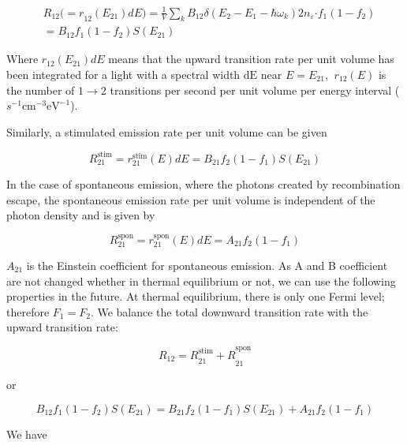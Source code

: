 \begin{eqnarray}
   & R_{12}{( = r}_{12}(E_{21})dE) = \frac{1}{V}\sum_{k}^{}{B_{12}\delta\left( E_{2} - E_{1} - \hbar\omega_{k} \right)}2n_{\varepsilon}\mathbf{\cdot}f_{1}(1 - f_{2})\nonumber \\
   & = B_{12}f_{1}(1 - f_{2})S\left( E_{21} \right)
\end{eqnarray}

Where \(r_{12}(E_{21})dE\) means that the upward transition rate per unit
volume has been integrated for a light with a spectral width \(\text{dE}\) near
\({E = E}_{21}\), \(\ r_{12}(E)\) is the number of $1\rightarrow2$ transitions
per second per unit volume per energy interval (\(s^{- 1}\text{cm}^{-
3}\text{eV}^{- 1}\)).

Similarly, a stimulated emission rate per unit volume can be given

\begin{equation}
  R_{21}^{\text{stim}} = r_{21}^{\text{stim}}(E)dE = B_{21}f_{2}(1 - f_{1})S\left( E_{21} \right)
\end{equation}

In the case of spontaneous emission, where the photons created by
recombination escape, the spontaneous emission rate per unit volume is
independent of the photon density and is given by

\begin{equation}
  R_{21}^{\text{spon}} = r_{21}^{\text{spon}}(E)dE = A_{21}f_{2}(1 - f_{1})
\end{equation}

\(A_{21}\) is the Einstein coefficient for spontaneous emission. As A
and B coefficient are not changed whether in thermal equilibrium or not,
we can use the following properties in the future. At thermal
equilibrium, there is only one Fermi level; therefore \(F_{1} = F_{2}\).
We balance the total downward transition rate with the upward transition
rate:

\begin{equation}
{{R_{12} = R}_{21}^{\text{stim}} + R}_{21}^{\text{spon}}
\end{equation}

or

\begin{equation}
B_{12}f_{1}\left( 1 - f_{2} \right)S\left( E_{21} \right) = B_{21}f_{2}\left( 1 - f_{1} \right)S\left( E_{21} \right) + A_{21}f_{2}(1 - f_{1})
\end{equation}

We have

